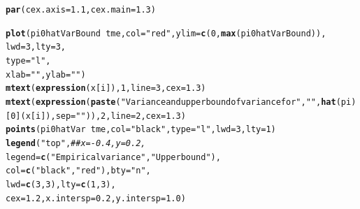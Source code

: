 \documentclass{article}\usepackage[]{graphicx}\usepackage[]{color}
\makeatletter
\newcommand{\hlnum}[1]{\textcolor[rgb]{0.686,0.059,0.569}{#1}}%
\newcommand{\hlstr}[1]{\textcolor[rgb]{0.192,0.494,0.8}{#1}}%
\newcommand{\hlcom}[1]{\textcolor[rgb]{0.678,0.584,0.686}{\textit{#1}}}%
\newcommand{\hlopt}[1]{\textcolor[rgb]{0,0,0}{#1}}%
\newcommand{\hlstd}[1]{\textcolor[rgb]{0.345,0.345,0.345}{#1}}%
\newcommand{\hlkwc}[1]{\textcolor[rgb]{0.333,0.667,0.333}{#1}}%
\newcommand{\hlkwd}[1]{\textcolor[rgb]{0.737,0.353,0.396}{\textbf{#1}}}%
\newenvironment{kframe}{%
 \def\at@end@of@kframe{}%
 \ifinner\ifhmode%
  \def\at@end@of@kframe{\end{minipage}}%
  \begin{minipage}{\columnwidth}%
 \fi\fi%
 \def\FrameCommand##1{\hskip\@totalleftmargin \hskip-\fboxsep
 \colorbox{shadecolor}{##1}\hskip-\fboxsep
     \hskip-\linewidth \hskip-\@totalleftmargin \hskip\columnwidth}%
 \MakeFramed {\advance\hsize-\width
   \@totalleftmargin\z@ \linewidth\hsize
   \@setminipage}}%
 {\par\unskip\endMakeFramed%
 \at@end@of@kframe}
\newenvironment{knitrout}{}{} %
\makeatother
\begin{document}
\begin{knitrout}
\color{fgcolor}\begin{kframe}
\begin{alltt}
\hlkwd{par}\hlstd{(}\hlkwc{cex.axis} \hlstd{=} \hlnum{1.1}\hlstd{,} \hlkwc{cex.main}\hlstd{=}\hlnum{1.3}\hlstd{)}

\hlkwd{plot}\hlstd{(pi0hatVarBound} \hlopt{~} \hlstd{tme,} \hlkwc{col}\hlstd{=}\hlstr{"red"}\hlstd{,} \hlkwc{ylim}\hlstd{=}\hlkwd{c}\hlstd{(}\hlnum{0}\hlstd{,} \hlkwd{max}\hlstd{(pi0hatVarBound)),}
     \hlkwc{lwd}\hlstd{=}\hlnum{3}\hlstd{,} \hlkwc{lty}\hlstd{=}\hlnum{3}\hlstd{,}
     \hlkwc{type}\hlstd{=}\hlstr{"l"}\hlstd{,}
     \hlkwc{xlab}\hlstd{=}\hlstr{""}\hlstd{,} \hlkwc{ylab}\hlstd{=}\hlstr{""}\hlstd{)}
\hlkwd{mtext}\hlstd{(}\hlkwd{expression}\hlstd{(x[i]),} \hlnum{1}\hlstd{,} \hlkwc{line}\hlstd{=}\hlnum{3}\hlstd{,} \hlkwc{cex}\hlstd{=}\hlnum{1.3}\hlstd{)}
\hlkwd{mtext}\hlstd{(}\hlkwd{expression}\hlstd{(}\hlkwd{paste}\hlstd{(}\hlstr{"Variance and upper bound of variance for "}\hlstd{,} \hlstr{" "}\hlstd{,} \hlkwd{hat}\hlstd{(pi)[}\hlnum{0}\hlstd{](x[i]),} \hlkwc{sep}\hlstd{=}\hlstr{" "}\hlstd{)),} \hlnum{2}\hlstd{,} \hlkwc{line}\hlstd{=}\hlnum{2}\hlstd{,} \hlkwc{cex}\hlstd{=}\hlnum{1.3}\hlstd{)}
\hlkwd{points}\hlstd{(pi0hatVar} \hlopt{~} \hlstd{tme,} \hlkwc{col}\hlstd{=}\hlstr{"black"}\hlstd{,} \hlkwc{type}\hlstd{=}\hlstr{"l"}\hlstd{,} \hlkwc{lwd}\hlstd{=}\hlnum{3}\hlstd{,} \hlkwc{lty}\hlstd{=}\hlnum{1}\hlstd{)}
\hlkwd{legend}\hlstd{(}\hlstr{"top"}\hlstd{,} \hlcom{##x=-0.4, y=0.2, }
       \hlkwc{legend}\hlstd{=}\hlkwd{c}\hlstd{(}\hlstr{"Empirical variance"}\hlstd{,} \hlstr{"Upper bound"}\hlstd{),}
       \hlkwc{col}\hlstd{=}\hlkwd{c}\hlstd{(}\hlstr{"black"}\hlstd{,} \hlstr{"red"}\hlstd{),} \hlkwc{bty}\hlstd{=}\hlstr{"n"}\hlstd{,}
       \hlkwc{lwd}\hlstd{=}\hlkwd{c}\hlstd{(}\hlnum{3}\hlstd{,}\hlnum{3}\hlstd{),} \hlkwc{lty}\hlstd{=}\hlkwd{c}\hlstd{(}\hlnum{1}\hlstd{,}\hlnum{3}\hlstd{),}
       \hlkwc{cex}\hlstd{=}\hlnum{1.2}\hlstd{,} \hlkwc{x.intersp}\hlstd{=}\hlnum{0.2}\hlstd{,} \hlkwc{y.intersp}\hlstd{=}\hlnum{1.0}\hlstd{)}
\end{alltt}
\end{kframe}


\end{knitrout}
\end{document}
